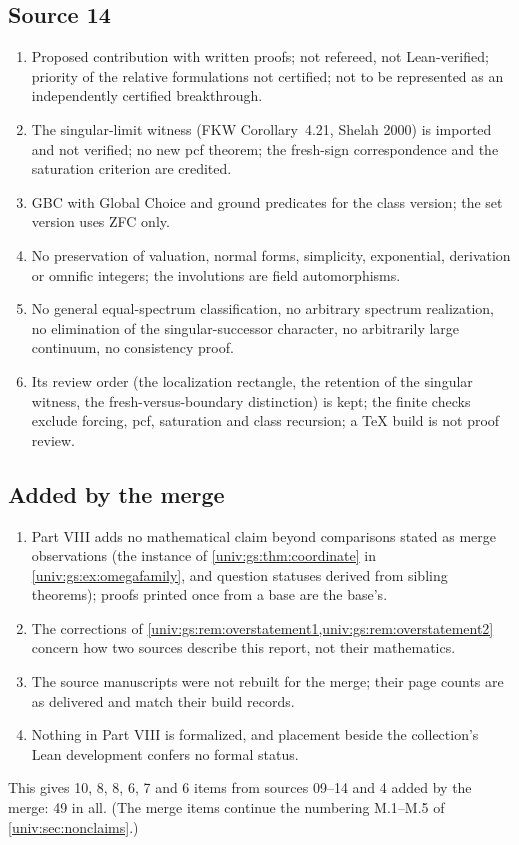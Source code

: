 \documentclass[11pt,letterpaper]{article}
\numberwithin{equation}{section}
\theoremstyle{definition}
\theoremstyle{remark}
\begin{document}
\subsection*{Source 14}
\begin{enumerate}[label=14.\arabic*,leftmargin=3.2em]
\item Proposed contribution with written proofs; not refereed, not Lean-verified; priority of the
relative formulations not certified; not to be represented as an independently certified
breakthrough.
\item The singular-limit witness (FKW Corollary~4.21, Shelah 2000) is imported and not verified; no new
pcf theorem; the fresh-sign correspondence and the saturation criterion are credited.
\item GBC with Global Choice and ground predicates for the class version; the set version uses ZFC
only.
\item No preservation of valuation, normal forms, simplicity, exponential, derivation or omnific
integers; the involutions are field automorphisms.
\item No general equal-spectrum classification, no arbitrary spectrum realization, no elimination of
the singular-successor character, no arbitrarily large continuum, no consistency proof.
\item Its review order (the localization rectangle, the retention of the singular witness, the
fresh-versus-boundary distinction) is kept; the finite checks exclude forcing, pcf, saturation and
class recursion; a TeX build is not proof review.
\end{enumerate}

\subsection*{Added by the merge}
\begin{enumerate}[label=M.\arabic*,leftmargin=3.2em,start=6]
\item Part VIII adds no mathematical claim beyond comparisons stated as merge observations (the
instance of \cref{univ:gs:thm:coordinate} in \cref{univ:gs:ex:omegafamily}, and question statuses
derived from sibling theorems); proofs printed once from a base are the base's.
\item The corrections of \cref{univ:gs:rem:overstatement1,univ:gs:rem:overstatement2} concern how two
sources describe this report, not their mathematics.
\item The source manuscripts were not rebuilt for the merge; their page counts are as delivered and
match their build records.
\item Nothing in Part VIII is formalized, and placement beside the collection's Lean development
confers no formal status.
\end{enumerate}
This gives 10, 8, 8, 6, 7 and 6 items from sources 09--14 and 4 added by the merge: 49 in all.
(The merge items continue the numbering M.1--M.5 of \cref{univ:sec:nonclaims}.)
\end{document}
